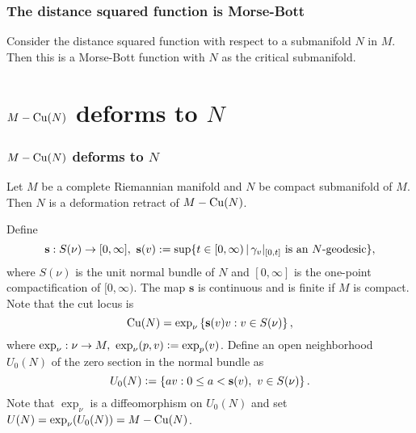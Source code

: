 \documentclass{beamer}
\begin{document}
	\begin{frame}
		\frametitle<presentation>{The distance squared function is Morse-Bott}
		\p
		\begin{tcolorbox}[
				breakable,
				title=Proposition,colback=white,
				colbacktitle=green!20!white,
				coltitle=black,
				fonttitle=\bfseries,
				bottomrule=0pt,
				toprule=0pt,
				leftrule=2pt,
				rightrule=0pt,
				titlerule=0pt,
				arc=2pt,
				outer arc=2pt,
				colframe=red ]
			Consider the distance squared function with respect to a submanifold $N$ in $M$. Then this is a Morse-Bott function with $N$ as the critical submanifold.
		\end{tcolorbox}
		
	\end{frame}	

	

		\section{\texorpdfstring{$M-\mathrm{Cu}(N)$}{} deforms to \texorpdfstring{$N$}{}} %
		\begin{frame}
			\frametitle<presentation>{$M-\mathrm{Cu}(N)$ deforms to $N$}
			\p 
			\begin{theorem}
				Let $M$ be a complete Riemannian manifold and $N$ be compact submanifold of $M$. Then $N$ is a deformation retract of $M-\mathrm{Cu}(N)$.
			\end{theorem}
			\p Define
			\begin{displaymath}
				\mathbf{s}:S(\nu)\to [0,\infty],\,\,\mathbf{s}(v):=\sup\{t\in [0,\infty)\,|\,\gamma_v |_{[0,t]}\,\,\textup{is an $N$-geodesic}\},
			\end{displaymath}
			where $S(\nu)$ is the unit normal bundle of $N$ and $[0,\infty]$ is the one-point compactification of $[0,\infty)$. \p The map $\mathbf{s}$ is continuous \p and is finite if $M$ is compact. \p Note that the cut locus is
			\begin{displaymath}
				\mathrm{Cu}(N) = \exp_\nu\left\{ \mathbf{s}(v)v: v\in S(\nu) \right\},
			\end{displaymath}
			\p where $\exp_\nu:\nu\to M,~\exp_\nu(p,v)\vcentcolon= \exp_p(v)$.
			\p Define an open neighborhood $U_0(N)$ of the zero section in the normal bundle as
			\begin{displaymath}
				U_0(N) \vcentcolon= \left\{ av: 0\le a< {\mathbf{s}}(v),~v\in S(\nu) \right\}.
			\end{displaymath}
			\p Note that $\exp_\nu$ is a diffeomorphism on $U_0(N)$ and set $U(N) = \exp_\nu(U_0(N)) = M - \mathrm{Cu}(N)$. 
		\end{frame}	
\end{document}
